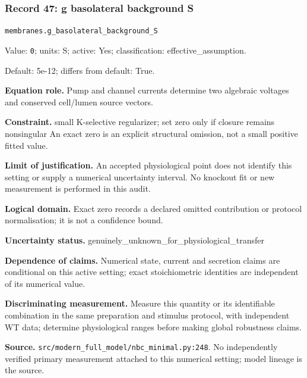 \subsubsection*{Record 47: g basolateral background S}
{\small \nolinkurl{membranes.g_basolateral_background_S}\par

Value: \texttt{0}; units: S; active: Yes; classification: effective\_assumption.\par

Default: 5e-12; differs from default: True.\par

\textbf{Equation role.} Pump and channel currents determine two algebraic voltages and conserved cell/lumen source vectors.\par

\textbf{Constraint.} small K-selective regularizer; set zero only if closure remains nonsingular An exact zero is an explicit structural omission, not a small positive fitted value.\par

\textbf{Limit of justification.} An accepted physiological point does not identify this setting or supply a numerical uncertainty interval. No knockout fit or new measurement is performed in this audit.\par

\textbf{Logical domain.} Exact zero records a declared omitted contribution or protocol normalisation; it is not a confidence bound.\par

\textbf{Uncertainty status.} genuinely\_unknown\_for\_physiological\_transfer\par

\textbf{Dependence of claims.} Numerical state, current and secretion claims are conditional on this active setting; exact stoichiometric identities are independent of its numerical value.\par

\textbf{Discriminating measurement.} Measure this quantity or its identifiable combination in the same preparation and stimulus protocol, with independent WT data; determine physiological ranges before making global robustness claims.\par

\textbf{Source.} \nolinkurl{src/modern_full_model/nbc_minimal.py:248}. No independently verified primary measurement attached to this numerical setting; model lineage is the source.\par}

